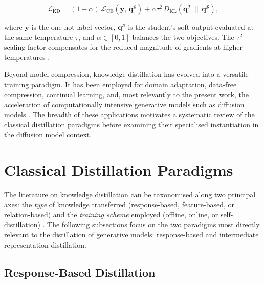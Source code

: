\begin{equation}
    \mathcal{L}_{\mathrm{KD}} = (1 - \alpha)\,\mathcal{L}_{\mathrm{CE}}\!\left(\mathbf{y},\, \mathbf{q}^{\mathcal{S}}\right)
    + \alpha \tau^2\, D_{\mathrm{KL}}\!\left(\mathbf{q}^{\mathcal{T}} \,\|\, \mathbf{q}^{\mathcal{S}}\right),
    \label{eq:kd_loss}
\end{equation}

\noindent where $\mathbf{y}$ is the one-hot label vector, $\mathbf{q}^{\mathcal{S}}$ is the student's
soft output evaluated at the same temperature $\tau$, and $\alpha \in [0,1]$ balances the two objectives.
The $\tau^2$ scaling factor compensates for the reduced magnitude of gradients at higher temperatures
\cite{hinton2015distilling}.

Beyond model compression, knowledge distillation has evolved into a versatile training paradigm.
It has been employed for domain adaptation, data-free compression, continual learning, and, most relevantly to the present work,
the acceleration of computationally intensive generative models such as diffusion models
\cite{salimans2022progressive, song2023consistency, luo2023lcm}.
The breadth of these applications motivates a systematic review of the classical distillation paradigms
before examining their specialised instantiation in the diffusion model context.

\section{Classical Distillation Paradigms}
\label{sec:kd_classical}

The literature on knowledge distillation can be taxonomised along two principal axes: the \emph{type} of
knowledge transferred (response-based, feature-based, or relation-based) and the \emph{training
scheme} employed (offline, online, or self-distillation) \cite{gou2021knowledge}.
The following subsections focus on the two paradigms most directly relevant to the distillation of
generative models: response-based and intermediate representation distillation.

\subsection{Response-Based Distillation}
\label{subsec:kd_response}

